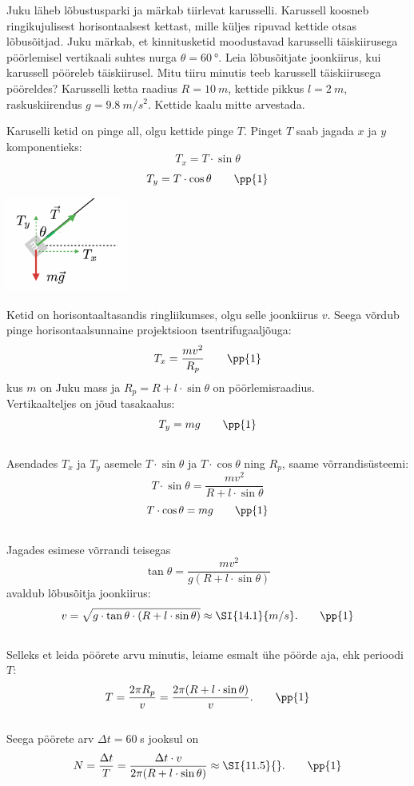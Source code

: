 \setAuthor{}

Juku läheb lõbustusparki ja märkab tiirlevat karusselli. Karussell koosneb ringikujulisest horisontaalsest kettast, mille küljes ripuvad kettide otsas lõbusõitjad. Juku märkab, et kinnitusketid moodustavad karusselli täiskiirusega pöörlemisel vertikaali suhtes nurga $\theta = \SI{60}{\degree}$.  Leia lõbusõitjate joonkiirus, kui karussell pööreleb täiskiirusel. Mitu tiiru minutis teeb karussell täiskiirusega pööreldes? Karusselli ketta raadius $R=\SI{10}{m}$, kettide pikkus $l=\SI{2}{m}$, raskuskiirendus $g=\SI{9,8}{m / s^2}$. Kettide kaalu mitte arvestada. 


\hint

\solu
Karuselli ketid on pinge all, olgu kettide pinge $T$. Pinget $T$ saab jagada $x$ ja $y$ komponentieks:  
$$T_x=T \cdot \sin{\theta}$$
$$T_y=T \cdot \cos{\theta} \qquad \pp{1} $$
 \begin{center}
\includegraphics[width=0.3\textwidth]{2020-v2g-02-sol.pdf}
\end{center}
Ketid on horisontaaltasandis ringliikumses, olgu selle joonkiirus $v$. Seega võrdub pinge horisontaalsunnaine projektsioon tsentrifugaaljõuga:
$$T_x = \frac{m v^2}{R_{p}}\quad\quad \pp{1}$$
kus $m$ on Juku mass ja $R_{p} = R + l \cdot \sin{\theta}$ on pöörlemisraadius.
\\
Vertikaalteljes on jõud tasakaalus:
$$T_y=mg \quad \quad \pp{1}$$ 
\\
Asendades $T_x$ ja $T_y$ asemele $T \cdot \sin{\theta}$ ja $T \cdot \cos{\theta}$ ning $R_{p}$, saame võrrandisüsteemi:
$$T \cdot \sin{\theta} = \frac{m v^2}{R + l \cdot \sin{\theta}}$$
$$T \cdot \cos{\theta} = mg \qquad \pp{1}$$ 
\\
Jagades esimese võrrandi teisegas
$$\tan{\theta}= \frac{mv^2}{g(R + l \cdot \sin{\theta})}$$
avaldub lõbusõitja joonkiirus:
$$v= \sqrt{g \cdot \tan{\theta} \cdot (R + l \cdot \sin{\theta})}\approx \SI{14.1}{m/s}. \qquad \pp{1}$$ 
\\
Selleks et leida pöörete arvu minutis, leiame esmalt ühe pöörde aja, ehk perioodi $T$:
$$T=\frac{2 \pi R_{p}}{v}=\frac{2 \pi (R + l \cdot \sin{\theta})}{v}. \qquad \pp{1}$$ 
\\
Seega pöörete arv  $\Delta t = 60\;$s jooksul on
$$N=\frac{\Delta t}{T} =\frac{\Delta t \cdot v}{2 \pi (R + l \cdot \sin{\theta})} \approx \SI{11.5}{}. \qquad \pp{1}$$
\probend